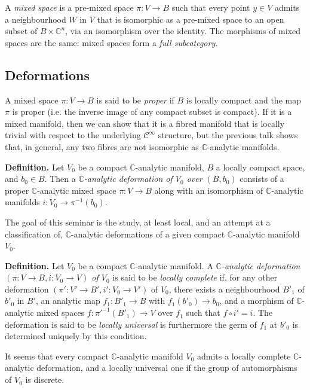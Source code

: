 \documentclass{article}
\newenvironment{rmenv}[1]
  {\phantomsection\par\medskip\noindent\textbf{#1.}\rmfamily}
  {\medskip}
\newcommand{\CC}{\mathbb{C}}
\newcommand{\oldpage}[1]{\marginpar{\footnotesize$\Big\vert$ \textit{p.~#1}}}
\begin{document}
A \emph{mixed space} is a pre-mixed space $\pi\colon V\to B$ such that every point $y\in V$ admits a neighbourhood $W$ in $V$ that is isomorphic as a pre-mixed space to an open subset of $B\times\CC^n$, via an isomorphism over the identity.
The morphisms of mixed spaces are the same: mixed spaces form a \emph{full subcategory}.


\subsection{Deformations}
\label{II.3}

A mixed space $\pi\colon V\to B$ is said to be \emph{proper} if $B$ is locally compact and the map $\pi$ is proper (i.e. the inverse image of any compact subset is compact).
If it is a mixed manifold, then we can show that it is a fibred manifold that is locally trivial with respect to the underlying $\mathscr{C}^\infty$ structure, but the previous talk shows that, in general, any two fibres are not isomorphic as $\CC$-analytic manifolds.

\begin{rmenv}{Definition}
  Let $V_0$ be a compact $\CC$-analytic manifold, $B$ a locally compact space, and $b_0\in B$.
  Then a \emph{$\CC$-analytic deformation of $V_0$ over $(B,b_0)$} consists of a proper $\CC$-analytic mixed space $\pi\colon V\to B$
\oldpage{2-04}
  along with an isomorphism of $\CC$-analytic manifolds $i\colon V_0\to\pi^{-1}(b_0)$.
\end{rmenv}

The goal of this seminar is the study, at least local, and an attempt at a classification of, $\CC$-analytic deformations of a given compact $\CC$-analytic manifold $V_0$.

\begin{rmenv}{Definition}
  Let $V_0$ be a compact $\CC$-analytic manifold.
  A \emph{$\CC$-analytic deformation $(\pi\colon V\to B,i\colon V_0\to V)$ of $V_0$} is said to be \emph{locally complete} if, for any other deformation $(\pi'\colon V'\to B',i'\colon V_0\to V')$ of $V_0$, there exists a neighbourhood $B'_1$ of $b'_0$ in $B'$, an analytic map $f_1\colon B'_1\to B$ with $f_1(b'_0)\to b_0$, and a morphism of $\CC$-analytic mixed spaces $f\colon {\pi'}^{-1}(B'_1)\to V$ over $f_1$ such that $f\circ i'=i$.
  The deformation is said to be \emph{locally universal} is furthermore the germ of $f_1$ at $b'_0$ is determined uniquely by this condition.
\end{rmenv}

It seems that every compact $\CC$-analytic manifold $V_0$ admits a locally complete $\CC$-analytic deformation, and a locally universal one if the group of automorphisms of $V_0$ is discrete.
\end{document}
